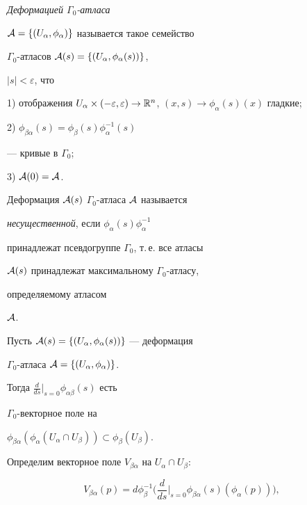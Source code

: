 {\em Деформацией $\Gamma_0$-атласа}


${\cal A}=\{(U_\alpha, \phi_\alpha)\}$ называется такое семейство


$\Gamma_0$-атласов ${\cal A}(s)=\{(U_\alpha, \phi_\alpha(s))\}$,


$|s|<\varepsilon$, что





1) отображения $U_\alpha \times (-\varepsilon,\varepsilon) \to


\R^n$, $(x,s) \to \phi_\alpha(s)(x)$  гладкие;





2) $\phi_{\beta\alpha}(s) = \phi_\beta(s)\phi^{-1}_\alpha(s)$


--- кривые в  $\Gamma_0$;





3) ${\cal A}(0) = {\cal A}$.





Деформация ${\cal A}(s)$ $\Gamma_0$-атласа ${\cal A}$ называется


{\em несущественной}, если $ \phi_\alpha(s)\phi^{-1}_\alpha$


принадлежат псевдогруппе $\Gamma_0$, т.\,е. все атласы


${\cal A}(s)$ принадлежат максимальному $\Gamma_0$-атласу,


определяемому атласом


${\cal A}$.








Пусть ${\cal A}(s)=\{(U_\alpha, \phi_\alpha(s))\}$ --- деформация


$\Gamma_0$-атласа ${\cal A}=\{(U_\alpha,\phi_\alpha)\}$.


Тогда $\frac{d}{ds}\big|_{s=0}\phi_{\alpha\beta}(s)$ есть


$\Gamma_0$-векторное поле на


$\phi_{\beta\alpha}(\phi_\alpha(U_\alpha \cap U_\beta)) \subset


\phi_\beta(U_\beta)$.





Определим векторное поле $V_{\beta\alpha}$ на $U_\alpha \cap


U_\beta$:


\begin{equation}\label{eq8}


V_{\beta\alpha}(p) =


d\phi_\beta^{-1}\bigg(\frac{d}{ds}\Big|_{s=0}


\phi_{\beta\alpha}(s)(\phi_\alpha(p)) \bigg),


\end{equation}


